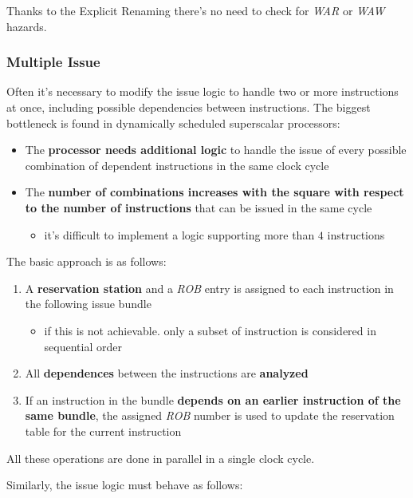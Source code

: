 \documentclass[english]{article}
\begin{document}
\bigskip
Thanks to the Explicit Renaming there's no need to check for \textit{WAR} or \textit{WAW} hazards.

\subsubsection{Multiple Issue}

Often it's necessary to modify the issue logic to handle two or more instructions at once, including possible dependencies between instructions.
The biggest bottleneck is found in dynamically scheduled superscalar processors:

\begin{itemize}
  \item The \textbf{processor needs additional logic} to handle the issue of every possible combination of dependent instructions in the same clock cycle
  \item The \textbf{number of combinations increases with the square with respect to the number of instructions} that can be issued in the same cycle
        \begin{itemize}
          \item it's difficult to implement a logic supporting more than \(4\) instructions
        \end{itemize}
\end{itemize}

\bigskip
The basic approach is as follows:

\begin{enumerate}
  \item A \textbf{reservation station} and a \textit{ROB} entry is assigned to each instruction in the following issue bundle
        \begin{itemize}
          \item if this is not achievable. only a subset of instruction is considered in sequential order
        \end{itemize}
  \item All \textbf{dependences} between the instructions are \textbf{analyzed}
  \item If an instruction in the bundle \textbf{depends on an earlier instruction of the same bundle}, the assigned \textit{ROB} number is used to update the reservation table for the current instruction
\end{enumerate}

All these operations are done in parallel in a single clock cycle.

Similarly, the issue logic must behave as follows:
\end{document}
